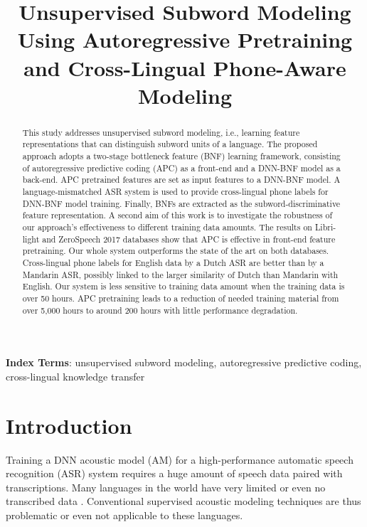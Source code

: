 \documentclass[a4paper]{article}
\title{Unsupervised Subword Modeling Using Autoregressive Pretraining and Cross-Lingual Phone-Aware Modeling}
\begin{document}
\maketitle
% 
\begin{abstract}
This study addresses unsupervised subword modeling, i.e., learning feature representations that can distinguish subword units of a language. 
The proposed approach adopts a two-stage bottleneck feature (BNF) learning framework, consisting of 
autoregressive predictive coding (APC) as a front-end  and a 
DNN-BNF model as a back-end. 
APC pretrained features are set as input features to a DNN-BNF model. A  language-mismatched ASR system is used to provide cross-lingual phone labels for DNN-BNF model training. Finally, BNFs are extracted as the subword-discriminative feature representation. A second aim of this work is to investigate the robustness of 
our
approach's effectiveness to different training data amounts. The results on Libri-light and ZeroSpeech 2017 databases show that APC is effective in front-end feature pretraining.
Our whole system outperforms the state of the art on both databases.
Cross-lingual phone labels for  English data by a Dutch ASR are better than by a Mandarin ASR, possibly linked to the larger similarity of Dutch than Mandarin with English.
Our system is less sensitive to training data amount  when the training data is over 50 hours.  
APC pretraining leads to a reduction of needed training material from over 5,000 hours to around 200 hours with little performance degradation.


\end{abstract}
\noindent\textbf{Index Terms}: unsupervised subword modeling, autoregressive predictive coding, cross-lingual knowledge transfer

\section{Introduction}

Training a DNN acoustic model (AM) for a high-performance automatic speech recognition (ASR) system requires a huge amount of speech data paired with  transcriptions. 
Many languages in the world have very limited or even no transcribed data \cite{dunbar2017zero}. 
Conventional supervised acoustic modeling techniques are thus problematic or even not applicable to these languages.
\end{document}
